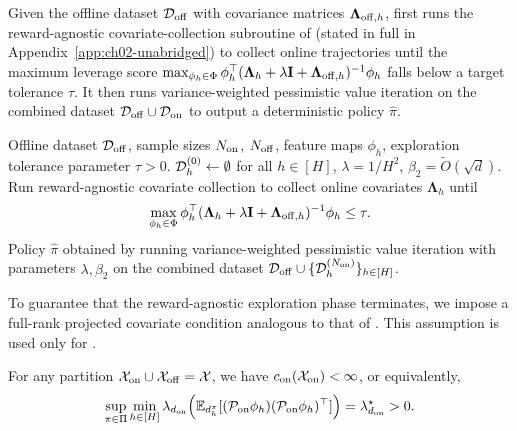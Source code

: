 Given the offline dataset ${\mathcal{D}}_{{\operatorname{off}}}$ with covariance matrices $\boldsymbol{\Lambda}_{{\operatorname{off}}, h}$,  first runs the reward-agnostic covariate-collection subroutine of \citet{wagenmaker2022instance} (stated in full in Appendix~\ref{app:ch02-unabridged}) to collect online trajectories until the maximum leverage score $\max_{\phi_h \in \Phi} \phi_h^\top (\boldsymbol{\Lambda}_h + \lambda \mathbf{I} + \boldsymbol{\Lambda}_{{\operatorname{off}}, h})^{-1}\phi_h$ falls below a target tolerance $\tau$. It then runs variance-weighted pessimistic value iteration \citep{xiong2023nearly} on the combined dataset ${\mathcal{D}}_{{\operatorname{off}}} \cup {\mathcal{D}}_{{\operatorname{on}}}$ to output a deterministic policy $\widehat{\pi}$.

\begin{algorithm}[htbp]
    \caption{Online-to-Offline Hybrid RL via Reward-Agnostic Exploration and Pessimistic Planning}
    \label{alg:ch02-alg2}
    \begin{algorithmic}[1]
         Offline dataset ${\mathcal{D}}_{{\operatorname{off}}}$, sample sizes $N_{{\operatorname{on}}}$, $N_{{\operatorname{off}}}$, feature maps $\phi_h$, exploration tolerance parameter $\tau > 0$.
         ${\mathcal{D}}_h^{(0)}\leftarrow \emptyset$ for all $h \in [H]$, $\lambda = 1/H^2$, $\beta_2 = \tilde{O}(\sqrt{d})$.
            \State Run reward-agnostic covariate collection \citep{wagenmaker2022instance} to collect online covariates $\boldsymbol{\Lambda}_{h}$ until
            \begin{equation*}
                \max_{\phi_h \in \Phi} \phi_h^{\top}(\boldsymbol{\Lambda}_{h} + \lambda \mathbf{I} + \boldsymbol{\Lambda}_{{\operatorname{off}},h})^{-1}\phi_h \leq \tau.
            \end{equation*}
        \EndFor
         Policy $\widehat{\pi}$ obtained by running variance-weighted pessimistic value iteration \citep{xiong2023nearly} with parameters $\lambda, \beta_2$ on the combined dataset ${\mathcal{D}}_{{\operatorname{off}}} \cup \{{\mathcal{D}}^{(N_{{\operatorname{on}}})}_h\}_{h \in [H]}$.
    \end{algorithmic}
\end{algorithm}

To guarantee that the reward-agnostic exploration phase terminates, we impose a full-rank projected covariate condition analogous to that of \citet{wagenmaker2023leveraging}. This assumption is used only for .

\begin{aspt}
\label{aspt:ch02-full-rank-proj-covariates}
For any partition ${\mathcal{X}}_{{\operatorname{on}}} \cup {\mathcal{X}}_{{\operatorname{off}}} = {\mathcal{X}}$, we have $c_{{\operatorname{on}}}({\mathcal{X}}_{{\operatorname{on}}}) < \infty$, or equivalently,
\begin{equation}
    \sup_{\pi \in \Pi} \min_{h \in [H]} \lambda_{d_{{\operatorname{on}}}}\!\left(\mathbb{E}_{d^\pi_h}[({\mathcal{P}}_{{\operatorname{on}}}\phi_h)({\mathcal{P}}_{{\operatorname{on}}}\phi_h)^{\top}]\right) = \lambda^\star_{d_{{\operatorname{on}}}} > 0.
\end{equation}
\end{aspt}

